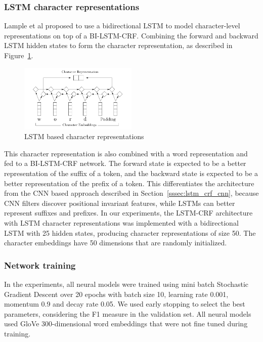 \documentclass{nle}
\begin{document}
\subsubsection{LSTM character representations}

Lample et al  proposed to use a bidirectional LSTM to model character-level 
representations on top of a BI-LSTM-CRF. Combining the forward and backward LSTM hidden states 
to form the character representation, as described in Figure~\ref{fig:lstm_char}. 

\begin{figure}[h]
  \centering
  \includegraphics[width=0.5\textwidth]{pics/lstm_char_representations}
  \caption{LSTM based character representations}
  \label{fig:lstm_char}
\end{figure}

This character representation is also combined with a word 
representation and fed to a BI-LSTM-CRF network. 
The forward state is expected to be a better representation of the suffix of 
a token, and the backward state is expected to be a better representation of 
the prefix of a token. This differentiates the architecture
from the CNN based approach described in Section~\ref{sssec:lstm_crf_cnn}, because CNN filters 
discover positional invariant features, while LSTMs can better represent 
suffixes and prefixes. In our experiments, 
the LSTM-CRF architecture with LSTM character representations was implemented with a bidirectional 
LSTM with 25 hidden states, producing character representations of 
size 50. The character embeddings have 50 dimensions that are randomly initialized.

\subsubsection{Network training}

In the experiments, all neural models were trained using mini batch Stochastic Gradient Descent over 20 epochs with batch size 10,
learning rate 0.001, momentum 0.9 and decay rate 0.05. We used early stopping \cite{Caruana2000} to select the best 
parameters, considering the F1 measure in the validation set. All neural models used 
GloVe 300-dimensional word embeddings \cite{Pennington2014} that were not fine tuned during training.
\end{document}
